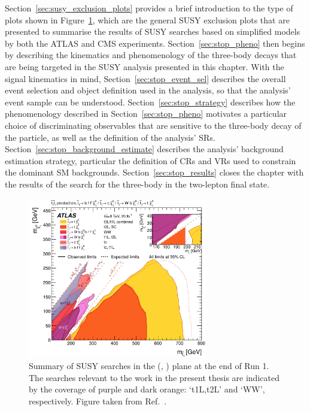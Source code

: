 Section~\ref{sec:susy_exclusion_plots} provides a brief introduction to the type of plots
shown in Figure~\ref{fig:run1_stop_summary}, which are the general SUSY exclusion plots
that are presented to summarise the results of SUSY searches based on simplified models
by both the ATLAS and CMS experiments.
Section~\ref{sec:stop_pheno} then begins by describing the kinematics and phenomenology of the three-body \stopone
decays that are being targeted in the SUSY analysis presented in this chapter.
With the signal kinematics in mind, Section~\ref{sec:stop_event_sel} describes the overall event
selection and object definition used in the analysis, so that the analysis' event sample can be understood.
Section~\ref{sec:stop_strategy} describes how the phenomenology described in Section~\ref{sec:stop_pheno}
motivates a particular choice of discriminating observables that are sensitive to the three-body decay
of the \stopone particle, as well as the definition of the analysis' SRs.
Section~\ref{sec:stop_background_estimate} describes the analysis' background estimation
strategy, particular the definition of CRs and VRs used to constrain the dominant
SM backgrounds.
Section~\ref{sec:stop_results} closes the chapter with the results of the search for
the three-body \stopone in the two-lepton final state.


\begin{figure}[!htb]
    \begin{center}
        \includegraphics[width=0.7\textwidth]{figures/search_stop2l/run1_stop_summary}
        \caption{
            Summary of SUSY \stopone searches in the (\stopone, \ninoone) plane
            at the end of Run 1.
            The searches relevant to the work in the present thesis are indicated by the 
            coverage of purple and dark orange: `t1L,t2L' and `WW', respectively.
            Figure taken from Ref.~\cite{StopRun1Summary}.
        }
        \label{fig:run1_stop_summary}
    \end{center}
\end{figure}

